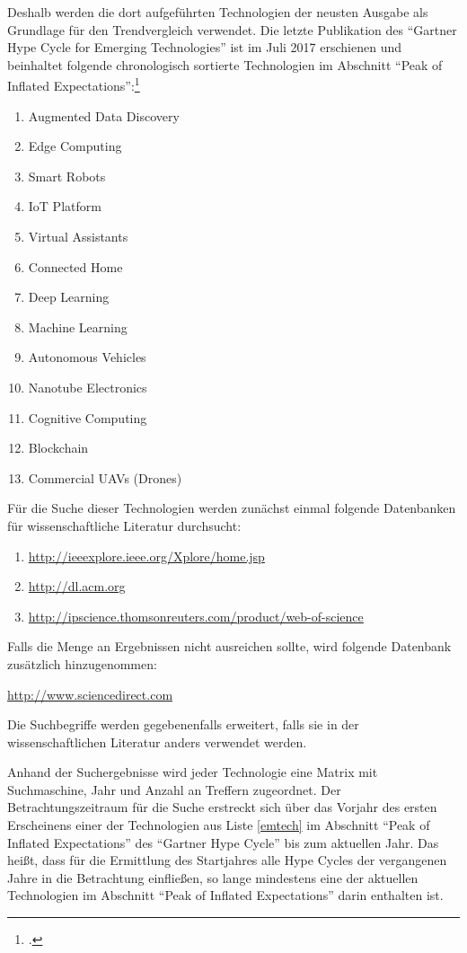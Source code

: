 Deshalb werden die dort aufgeführten Technologien der neusten Ausgabe als Grundlage für den Trendvergleich verwendet. Die letzte Publikation des 
"`Gartner Hype Cycle for Emerging Technologies"' ist im Juli 2017 erschienen und beinhaltet folgende chronologisch sortierte Technologien im Abschnitt "`Peak of Inflated Expectations"':\footcite[Vgl.][S.34-55]{Walker2017}
\begin{enumerate}
	\label{emtech}
	\item Augmented Data Discovery
	\item Edge Computing
	\item Smart Robots
	\item IoT Platform
	\item Virtual Assistants
	\item Connected Home
	\item Deep Learning
	\item Machine Learning
	\item Autonomous Vehicles
	\item Nanotube Electronics
	\item Cognitive Computing
	\item Blockchain
	\item Commercial UAVs (Drones)
\end{enumerate}

Für die Suche dieser Technologien werden zunächst einmal folgende Datenbanken für wissenschaftliche Literatur durchsucht:
\begin{enumerate}
	\item \url{http://ieeexplore.ieee.org/Xplore/home.jsp}
	\item \url{http://dl.acm.org}
	\item \url{http://ipscience.thomsonreuters.com/product/web-of-science}
\end{enumerate}

Falls die Menge an Ergebnissen nicht ausreichen sollte, wird folgende Datenbank zusätzlich hinzugenommen:

\url{http://www.sciencedirect.com}

Die Suchbegriffe werden gegebenenfalls erweitert, falls sie in der wissenschaftlichen Literatur anders verwendet werden.

Anhand der Suchergebnisse wird jeder Technologie eine Matrix mit Suchmaschine, Jahr und Anzahl an Treffern zugeordnet.
Der Betrachtungszeitraum für die Suche erstreckt sich über das Vorjahr des ersten Erscheinens einer der Technologien aus Liste \ref{emtech} im Abschnitt "`Peak of Inflated Expectations"' des "`Gartner Hype Cycle"' bis zum aktuellen Jahr. Das heißt, dass für die Ermittlung des Startjahres alle Hype Cycles der vergangenen Jahre in die Betrachtung einfließen, so lange mindestens eine der aktuellen Technologien im Abschnitt "`Peak of Inflated Expectations"' darin enthalten ist.

